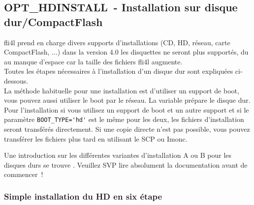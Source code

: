 

\subsection {OPT\_HDINSTALL~- Installation sur disque dur/CompactFlash}

    fli4l prend en charge divers supports d'installations (CD, HD, réseau, carte
    CompactFlash, ...) dans la version 4.0 les disquettes ne seront plus
    supportés, du au manque d'espace car la taille des fichiers fli4l augmente.\\
    
    Toutes les étapes nécessaires à l'installation d'un disque dur sont
    expliquées ci-dessous.\\
    
    La méthode habituelle pour une installation est d'utiliser un support de
    boot, vous pouvez aussi utiliser le boot par le réseau. La variable
     prépare le disque dur. Pour l'installation si vous
    utilisez un support de boot et un autre support et si le paramètre
    \verb*?BOOT_TYPE='hd'? est le même pour les deux, les fichiers d'installation
    seront transférés directement. Si une copie directe n'est pas possible,
    vous pouvez transférer les fichiers plus tard en utilisant le SCP ou Imonc.

    Une introduction sur les différentes variantes d'installation A ou B pour les
    disques durs se trouve .
    Veuillez SVP lire absolument la documentation avant de commencer~!

    \subsubsection{Simple installation du HD en six étape}


